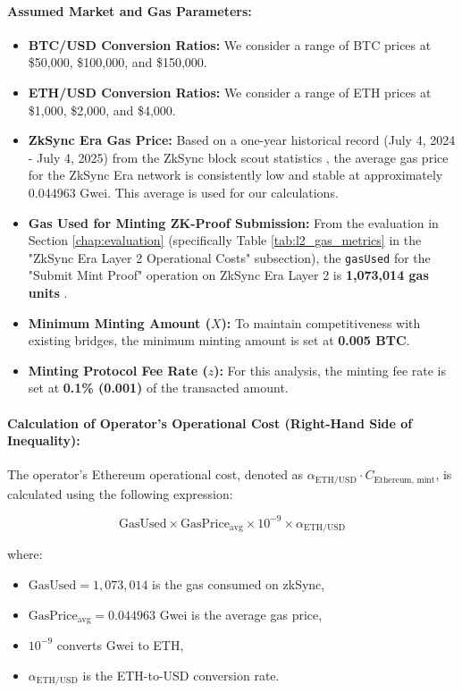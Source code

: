 \documentclass{DESSThesis}
\begin{document}
\paragraph{Assumed Market and Gas Parameters:}
\begin{itemize}
    \item \textbf{BTC/USD Conversion Ratios:} We consider a range of BTC prices at \$50,000, \$100,000, and \$150,000.
    \item \textbf{ETH/USD Conversion Ratios:} We consider a range of ETH prices at \$1,000, \$2,000, and \$4,000.
    \item \textbf{ZkSync Era Gas Price:} Based on a one-year historical record (July 4, 2024 - July 4, 2025) from the ZkSync block scout statistics \cite{noauthor_zksync_nodate}, the average gas price for the ZkSync Era network is consistently low and stable at approximately 0.044963 Gwei. This average is used for our calculations.
    \item \textbf{Gas Used for Minting ZK-Proof Submission:} From the evaluation in Section \ref{chap:evaluation} (specifically Table \ref{tab:l2_gas_metrics} in the "ZkSync Era Layer 2 Operational Costs" subsection), the \texttt{gasUsed} for the "Submit Mint Proof" operation on ZkSync Era Layer 2 is \textbf{1,073,014 gas units}  .
    \item \textbf{Minimum Minting Amount (\(X\)):} To maintain competitiveness with existing bridges, the minimum minting amount is set at \textbf{0.005 BTC}.
    \item \textbf{Minting Protocol Fee Rate (\(z\)):} For this analysis, the minting fee rate is set at \textbf{0.1\% (0.001)} of the transacted amount.
\end{itemize}

\paragraph{Calculation of Operator's Operational Cost (Right-Hand Side of Inequality):}
The operator's Ethereum operational cost, denoted as 
\(\alpha_{\text{ETH/USD}} \cdot C_{\text{Ethereum, mint}}\), 
is calculated using the following expression:

\[
\text{GasUsed} \times \text{GasPrice}_{\text{avg}} \times 10^{-9} \times \alpha_{\text{ETH/USD}}
\]

where:
\begin{itemize}
    \item \(\text{GasUsed} = 1,\!073,\!014\) is the gas consumed on zkSync,
    \item \(\text{GasPrice}_{\text{avg}} = 0.044963\) Gwei is the average gas price,
    \item \(10^{-9}\) converts Gwei to ETH,
    \item \(\alpha_{\text{ETH/USD}}\) is the ETH-to-USD conversion rate.
\end{itemize}
\end{document}
